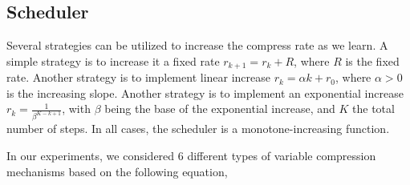 \subsection{Scheduler}
\label{appendix:scheduler}
Several strategies can be utilized to increase the compress rate as we learn. A simple strategy is to increase it a fixed rate $r_{k+1}=r_k+R$, where $R$ is the fixed rate. Another strategy is to implement linear increase $r_{k}=\alpha k+r_0$, where $\alpha>0$ is the increasing slope. Another strategy is to implement an exponential increase $r_k=\frac{1}{\beta^{K-k+1}}$, with $\beta$ being the base of the exponential increase, and $K$ the total number of steps. In all cases, the scheduler is a monotone-increasing function. 

In our experiments, we considered $6$ different types of variable compression mechanisms based on the following equation, 

